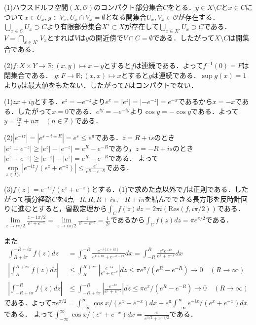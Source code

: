 \documentclass[
		book,
		head_space=20mm,
		foot_space=20mm,
		gutter=10mm,
		line_length=190mm
]{jlreq}
\begin{document}
(1)ハウスドルフ空間$(X,\mathcal{O})$のコンパクト部分集合$C$をとる．$y \in X \setminus C$と$x\in C$について$x \in U_x,y\in V_x,U_x \cap V_x=\emptyset$となる開集合$U_x,V_x\in \mathcal{O}$が存在する．$\bigcup\limits_{x\in C }U_x\supset C$より有限部分集合$X' \subset X$が存在して$\bigcup\limits_{x\in X'}U_x\supset C$である．$V=\bigcap\limits_{x\in X'}V_x$とすれば$V$は$y$の開近傍で$V\cap C=\emptyset$である．したがって$X\setminus C$は開集合である．

(2)$f\colon X \times Y \rightarrow \mathbb{R};(x,y)\mapsto x-y$とすると$f$は連続である．よって$f^{-1}(0)=F$は閉集合である．
$g\colon F \rightarrow \mathbb{R};(x,x)\mapsto x$とすると$g$は連続である．$\sup g(x)=1$より$g$は最大値をもたない．したがって$F$はコンパクトでない．

(1)$zx+iy$とする．$e^z=-e^{-z}$より$e^x=|e^z|=|-e^{-z}|=e^{-x}$であるから$x=-x$である．したがって$x=0$である．$e^{iy}=-e^{-iy}$より$\cos y=-\cos y$である．よって$y=\frac{i\pi}{2}+n\pi\quad(n\in \mathbb{Z})$である．

(2)$|e^{-iz}|=|e^{s-i\pm{R}}|=e^s\le e^\pi$である．$z=R+is$のとき$|e^z+e^{-z}|\ge |e^z|-|e^{-z}|=e^R-e^{-R}$であり，$z=-R+is$のとき$|e^z+e^{-z}|\ge |e^{-z}|-|e^{z}|=e^R-e^{-R}$である．
よって$\sup\limits_{z\in \Gamma_R}|e^{-iz}/(e^z+e^{-z})|\le \frac{e^\pi}{e^R-e^{-R}}$である．

(3)$f(z)=e^{-iz}/(e^z+e^{-z})$とする．(1)で求めた点以外で$f$は正則である．したがって積分経路$C$を4点$-R,R,R+i\pi,-R+i\pi$を結んでできる長方形を反時計回りに進むとすると，留数定理から$\int_C f(z)dz=2\pi i(\mathrm{Res}(f,i\pi/2))$である．
$\lim\limits_{z\to i\pi/2}\frac{z-1\pi/2}{e^z+e^{-z}}=\lim\limits_{z\to i\pi/2}\frac{1}{e^z-e^{-z}}=\frac{1}{2i}$であるから$\int_C f(z)dz=\pi e^{\pi/2}$である．

また \begin{align}
	\int_{R+i\pi}^{-R+i\pi}f(z)dz&=\int_{R}^{-R}\frac{e^{-i(x+i\pi)}}{e^{x+i\pi}+e^{-x-i\pi}}dx=\int_{-R}^{R}\frac{e^{\pi}e^{-ix}}{e^{x}+e^{-x}}dx\\
	\left| \int_{R}^{R+i\pi}f(z)dz \right|&\le \int_{R}^{R+i\pi}\left| \frac{e^{-iz}}{e^z+e^{-z}} \right|dz\le \pi e^\pi/(e^R-e^{-R})\rightarrow 0\quad (R\to \infty)\\
	\left| \int_{-R+i\pi}^{-R}f(z)dz \right|&\le \int_{-R+i\pi}^{-R}\left| \frac{e^{-iz}}{e^z+e^{-z}} \right|dz\le \pi e^\pi/(e^R-e^{-R})\rightarrow 0\quad (R\to \infty)
\end{align}である．よって$\pi e^{\pi/2}=\int_{-\infty}^\infty \cos x/(e^{x}+e^{-x})dx+e^{\pi}\int_{-\infty}^\infty e^{-ix}/(e^{x}+e^{-x})dx$である．
よって$\int_{-\infty}^\infty \cos x/(e^{x}+e^{-x})dx=\frac{\pi }{e^{\pi/2}+e^{-\pi/2}}$である．
	
\end{document}
